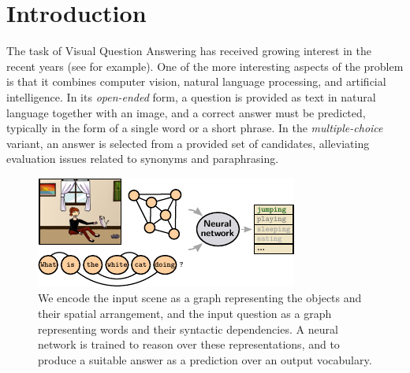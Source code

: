 \section{Introduction}

The task of Visual Question Answering has received growing interest in the recent years (see \cite{malinowski2014multi,antol2015vqa,wu2016survey} for example). One of the more interesting aspects of the problem is that it combines computer vision, natural language processing, and artificial intelligence. In its \textit{open-ended} form, a question is provided as text in natural language together with an image, and a correct answer must be predicted, typically in the form of a single word or a short phrase. In the \textit{multiple-choice} variant, an answer is selected from a provided set of candidates, alleviating evaluation issues related to synonyms and paraphrasing. 

\begin{figure}[t]
  \begin{center}
  \includegraphics[width=0.99\linewidth]{fig-teaser.pdf}
  \end{center}
  \label{fig:teaser}
  \vspace{-6pt}
  \caption{We encode the input scene as a graph representing the objects and their spatial arrangement, and the input question as a graph representing words and their syntactic dependencies. A neural network is trained to reason over these representations, and to produce a suitable answer as a prediction over an output vocabulary.}
  \vspace{-8pt}
\end{figure}

